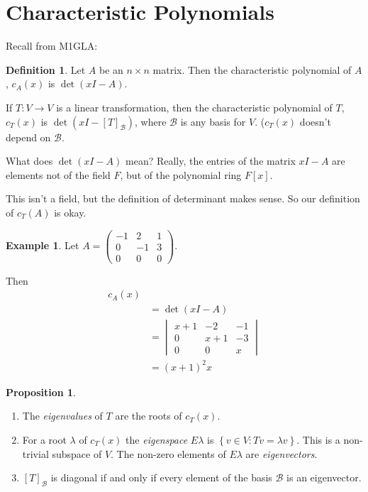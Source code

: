 \documentclass{article}
\theoremstyle{definition} \newtheorem*{definition}{Definition}
\newtheorem{proposition}[theorem]{Proposition}
\newtheorem*{exmp}{Example} \newtheorem*{exmps}{Examples}
\newcommand{\B}{\mathcal{B}}
\begin{document}
 \section{Characteristic Polynomials}
 Recall from M1GLA:\\
\begin{definition}
  Let $A$ be an $n\times n$ matrix. Then the characteristic polynomial of 
  $A$, $c_A(x)$ is $\det(xI - A)$.

  If $T:V \rightarrow V$ is a linear transformation, then the 
  characteristic polynomial of $T$, $c_T(x)$ is 
  $\det(xI - [T]_\B)$, where $\mathcal{B}$ is any basis for $V$.
  ($c_T(x)$ doesn't depend on $\mathcal{B}$.
\end{definition}

What does $\det{(xI - A)}$ mean? Really, the entries of the matrix $xI - A$
are elements not of the field $F$, but of the polynomial ring $F[x]$.

This isn't a field, but the definition of determinant makes sense. So
our definition of $c_T(A)$ is okay.

\begin{exmp}
  Let $A = \left( 
  \begin{matrix}
    -1 & 2 & 1 \\
    0 & -1 & 3 \\
    0 & 0 & 0
  \end{matrix}
  \right)$. 
  
  Then 
  \begin{align*}
  c_A(x) \\ &= \det(xI - A) \\
  &= 
  \begin{vmatrix}
    x+1 & -2 & -1 \\
    0 & x+1 & -3 \\
    0 & 0 & x
  \end{vmatrix}\\
   &= (x+1)^2 x
  \end{align*}
\end{exmp}

\begin{proposition}
  \hfill
  \begin{enumerate}
    \item The \emph{eigenvalues} of $T$ are the roots of $c_T(x)$.
    \item For a root $\lambda$ of $c_T(x)$ the \emph{eigenspace}
      $E\lambda$ is $\left\{ v \in V : Tv = \lambda v \right\}$.
      This is a non-trivial subspace of $V$. The non-zero elements
      of $E\lambda$ are \emph{eigenvectors}.
    \item $[T]_\B$ is diagonal if and only if every element of the basis
      $\B$ is an eigenvector.\\
  \end{enumerate}
\end{proposition}
\end{document}
